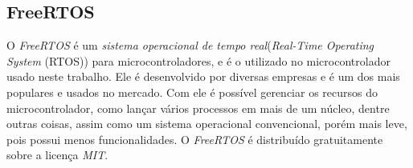 \subsection{FreeRTOS}
O \emph{FreeRTOS} é um \emph{sistema operacional de tempo real}(\emph{Real-Time Operating System} (RTOS)) para microcontroladores, e é o utilizado no microcontrolador usado neste trabalho. Ele é desenvolvido por diversas empresas e é um dos mais populares e usados no mercado. Com ele é possível gerenciar os recursos do microcontrolador, como lançar vários processos em mais de um núcleo, dentre outras coisas, assim como um sistema operacional convencional, porém mais leve, pois possui menos funcionalidades. O \emph{FreeRTOS} é distribuído gratuitamente sobre a licença \textit{MIT}.

